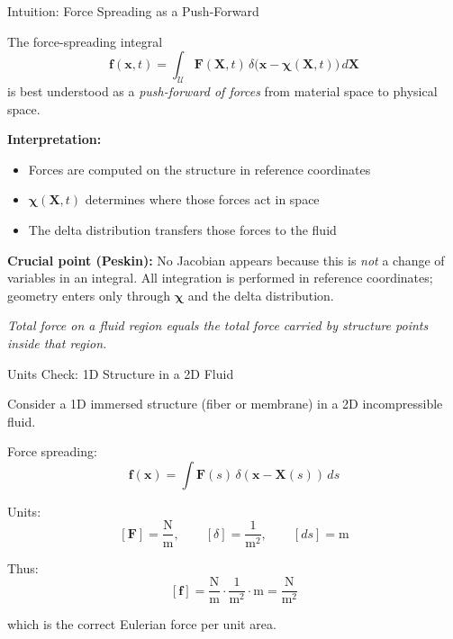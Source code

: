 \documentclass{beamer}
\begin{document}
\begin{frame}{Intuition: Force Spreading as a Push-Forward}
\small

The force-spreading integral
\[
\mathbf{f}(\mathbf{x},t)
=
\int_{\mathcal{U}}
\mathbf{F}(\mathbf{X},t)\,
\delta\!\big(\mathbf{x}-\boldsymbol{\chi}(\mathbf{X},t)\big)\,d\mathbf{X}
\]
is best understood as a \emph{push-forward of forces} from material space to physical space.

\medskip

\textbf{Interpretation:}
\begin{itemize}
    \item Forces are computed on the structure in reference coordinates
    \item $\boldsymbol{\chi}(\mathbf{X},t)$ determines where those forces act in space
    \item The delta distribution transfers those forces to the fluid
\end{itemize}

\medskip

\textbf{Crucial point (Peskin):}
No Jacobian appears because this is \emph{not} a change of variables in an integral.
All integration is performed in reference coordinates; geometry enters only through
$\boldsymbol{\chi}$ and the delta distribution.

\medskip

\textit{Total force on a fluid region equals the total force carried by structure points inside that region.}

\end{frame}



\begin{frame}{Units Check: 1D Structure in a 2D Fluid}

Consider a 1D immersed structure (fiber or membrane)
in a 2D incompressible fluid.

\medskip

Force spreading:
\[
\mathbf{f}(\mathbf{x})
=
\int
\mathbf{F}(s)\,
\delta(\mathbf{x}-\mathbf{X}(s))\,ds
\]

\medskip

Units:
\[
[\mathbf{F}] = \frac{\text{N}}{\text{m}},
\qquad
[\delta] = \frac{1}{\text{m}^2},
\qquad
[ds] = \text{m}
\]

\medskip

Thus:
\[
[\mathbf{f}]
=
\frac{\text{N}}{\text{m}}
\cdot
\frac{1}{\text{m}^2}
\cdot
\text{m}
=
\frac{\text{N}}{\text{m}^2}
\]

\medskip

which is the correct Eulerian force per unit area.

\end{frame}
\end{document}
